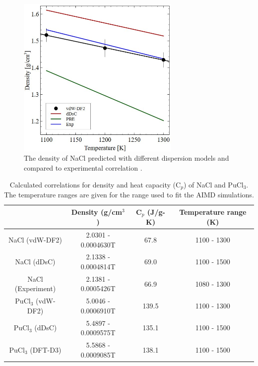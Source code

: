 \documentclass[review]{elsarticle}
\begin{document}
\begin{figure}[h!]
 \centering
 \includegraphics[width=0.7\textwidth]{NaCl-density.jpg} 
 \caption{The density of NaCl predicted with different dispersion models\cite{ANDERSSON2022153836} and compared to experimental correlation \cite{janz1988thermodynamic}.}
 \label{fig:NaCl_density}
\end{figure}

\begin{table}[h!]
\caption{Calculated correlations for density and heat capacity (C$_p$) of NaCl and PuCl$_3$. The temperature ranges are given for the range used to fit the AIMD simulations.}
\centering
\begin{tabular}{|c|c|c|c|}
\hline
                      & Density (g/cm$^{3}$) & C$_p$ (J/g-K)   & Temperature range (K)     \\
\hline
NaCl (vdW-DF2)        &  2.0301 - 0.0004630T             & 67.8 &  1100 - 1300  \\
NaCl (dDsC) \cite{ANDERSSON2022153836}        &  2.1338 - 0.0004814T                     & 69.0 &  1100  - 1500  \\
NaCl (Experiment)      & 2.1381 - 0.0005426T  \cite{janz1988thermodynamic}         &66.9 \cite{nist_ref}    & 1080 - 1300 \cite{janz1988thermodynamic} \\
PuCl$_{3}$ (vdW-DF2) &   5.0046 - 0.0006910T                   & 139.5 &    1100 - 1300 \\
PuCl$_{3}$ (dDsC)    &   5.4897 - 0.0009575T                   & 135.1 &    1100 - 1500   \\
PuCl$_3$ (DFT-D3)       &    5.5868 - 0.0009085T                  & 138.1 &   1100 - 1500 \\
\hline 
\end{tabular}
\label{table:rho_cp_correlation}
\end{table}
\end{document}
